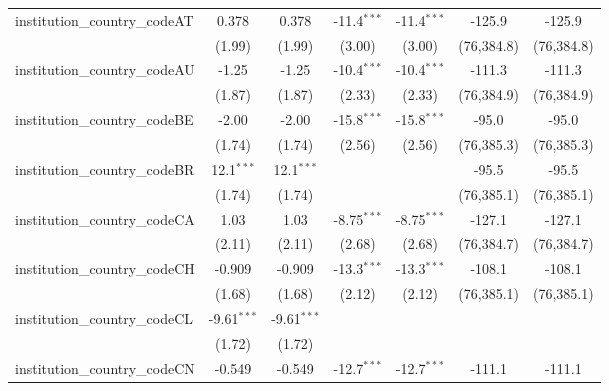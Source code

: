 \begin{tabular}{lcccccc}
   institution\_country\_codeAT          & 0.378         & 0.378         & -11.4$^{***}$ & -11.4$^{***}$ & -125.9       & -125.9\\   
                                         & (1.99)        & (1.99)        & (3.00)        & (3.00)        & (76,384.8)   & (76,384.8)\\   
   institution\_country\_codeAU          & -1.25         & -1.25         & -10.4$^{***}$ & -10.4$^{***}$ & -111.3       & -111.3\\   
                                         & (1.87)        & (1.87)        & (2.33)        & (2.33)        & (76,384.9)   & (76,384.9)\\   
   institution\_country\_codeBE          & -2.00         & -2.00         & -15.8$^{***}$ & -15.8$^{***}$ & -95.0        & -95.0\\   
                                         & (1.74)        & (1.74)        & (2.56)        & (2.56)        & (76,385.3)   & (76,385.3)\\   
   institution\_country\_codeBR          & 12.1$^{***}$  & 12.1$^{***}$  &               &               & -95.5        & -95.5\\   
                                         & (1.74)        & (1.74)        &               &               & (76,385.1)   & (76,385.1)\\   
   institution\_country\_codeCA          & 1.03          & 1.03          & -8.75$^{***}$ & -8.75$^{***}$ & -127.1       & -127.1\\   
                                         & (2.11)        & (2.11)        & (2.68)        & (2.68)        & (76,384.7)   & (76,384.7)\\   
   institution\_country\_codeCH          & -0.909        & -0.909        & -13.3$^{***}$ & -13.3$^{***}$ & -108.1       & -108.1\\   
                                         & (1.68)        & (1.68)        & (2.12)        & (2.12)        & (76,385.1)   & (76,385.1)\\   
   institution\_country\_codeCL          & -9.61$^{***}$ & -9.61$^{***}$ &               &               &              &   \\   
                                         & (1.72)        & (1.72)        &               &               &              &   \\   
   institution\_country\_codeCN          & -0.549        & -0.549        & -12.7$^{***}$ & -12.7$^{***}$ & -111.1       & -111.1\\   

\end{tabular}
